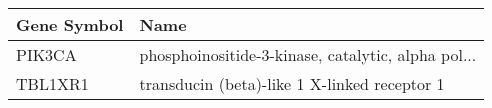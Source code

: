\begin{tabular}{ll}
\toprule
Gene Symbol &                                               Name \\
\midrule
     PIK3CA & phosphoinositide-3-kinase, catalytic, alpha pol... \\
    TBL1XR1 &       transducin (beta)-like 1 X-linked receptor 1 \\
\bottomrule
\end{tabular}
